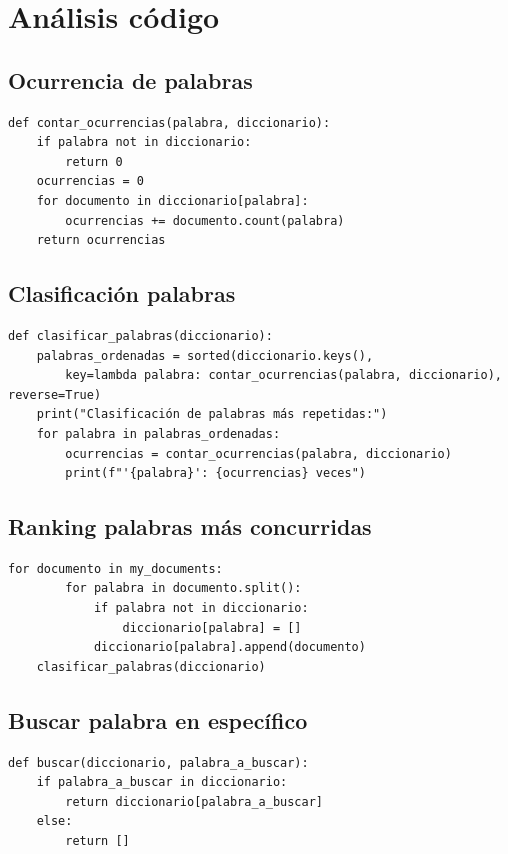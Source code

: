 \documentclass[conference]{IEEEtran}
\begin{document}
\section{Análisis código }

\subsection{Ocurrencia de palabras}
\begin{verbatim}
def contar_ocurrencias(palabra, diccionario):
    if palabra not in diccionario:
        return 0
    ocurrencias = 0
    for documento in diccionario[palabra]:
        ocurrencias += documento.count(palabra)
    return ocurrencias
\end{verbatim}
\vspace{3cm}
\subsection{Clasificación palabras}
\begin{verbatim}
def clasificar_palabras(diccionario):
    palabras_ordenadas = sorted(diccionario.keys(), 
        key=lambda palabra: contar_ocurrencias(palabra, diccionario), reverse=True)
    print("Clasificación de palabras más repetidas:")
    for palabra in palabras_ordenadas:
        ocurrencias = contar_ocurrencias(palabra, diccionario)
        print(f"'{palabra}': {ocurrencias} veces")
\end{verbatim}
\vspace{0.4cm}
\subsection{Ranking palabras más concurridas}
\begin{verbatim}
for documento in my_documents:
        for palabra in documento.split():
            if palabra not in diccionario:
                diccionario[palabra] = []
            diccionario[palabra].append(documento)
    clasificar_palabras(diccionario)
\end{verbatim}
\vspace{0.5cm}
\subsection{Buscar palabra en específico}
\begin{verbatim}
def buscar(diccionario, palabra_a_buscar):
    if palabra_a_buscar in diccionario:
        return diccionario[palabra_a_buscar]
    else:
        return []
\end{verbatim}
\vspace{0.4cm}
\end{document}
